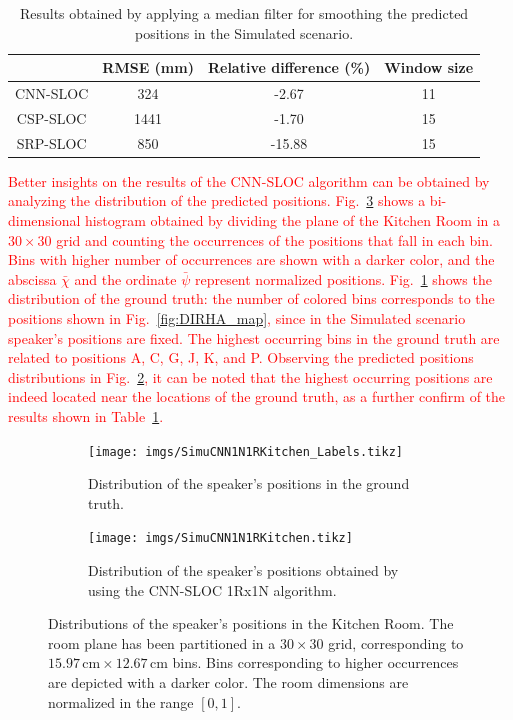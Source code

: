 \documentclass[review]{elsarticle}
\newcommand{\figref}[1]{Fig.~\ref{#1}}
\newcommand{\tableref}[1]{Table~\ref{#1}}
\begin{document}
\begin{table}[t]
\centering
\caption{Results obtained by applying a median filter for smoothing the predicted positions in the Simulated scenario.}\label{tab:smooth_sim}
\begin{tabular}{c | c | c | c}
  	 				& RMSE (mm) & Relative difference (\%) & Window size \\
\hline
CNN-SLOC    & 324 & -2.67  & 11\\
CSP-SLOC    & 1441 & -1.70 & 15\\
SRP-SLOC    & 850 & -15.88 & 15\\
\end{tabular}
\end{table}

\textcolor{red}{
Better insights on the results of the CNN-SLOC algorithm can be obtained by analyzing the distribution of the predicted positions. \figref{fig:distr_simu} shows a bi-dimensional histogram obtained by dividing the plane of the Kitchen Room in a $30 \times 30$ grid and counting the occurrences of the positions that fall in each bin. Bins with higher number of occurrences are shown with a darker color, and the abscissa $\bar{\chi}$ and the ordinate $\bar{\psi}$ represent normalized positions. \figref{fig:distr_simu_gt} shows the distribution of the ground truth: the number of colored bins corresponds to the positions shown in \figref{fig:DIRHA_map}, since in the Simulated scenario speaker's positions are fixed. The highest occurring bins in the ground truth are related to positions A, C, G, J, K, and P. Observing the predicted positions distributions in \figref{fig:distr_simu_pred}, it can be noted that the highest occurring positions are indeed located near the locations of the ground truth, as a further confirm of the results shown in \tableref{tab:smooth_sim}.}

\begin{figure}[t]
\centering
\begin{subfigure}[t]{0.45\textwidth}
\texttt{[image: imgs/SimuCNN1N1RKitchen\_Labels.tikz]}
\caption{Distribution of the speaker's positions in the ground truth.}\label{fig:distr_simu_gt}
\end{subfigure}
\begin{subfigure}[t]{0.45\textwidth}
\texttt{[image: imgs/SimuCNN1N1RKitchen.tikz]}
\caption{Distribution of the speaker's positions obtained by using the CNN-SLOC 1Rx1N algorithm.}\label{fig:distr_simu_pred}
\end{subfigure}
\caption{Distributions of the speaker's positions in the Kitchen Room. The room plane has been partitioned in a $30\times 30$ grid, corresponding to $15.97\,\text{cm} \times 12.67\,\text{cm}$ bins. Bins corresponding to higher occurrences are depicted with a darker color. The room dimensions are normalized in the range $[0,1]$.}\label{fig:distr_simu}
\end{figure}
\end{document}

